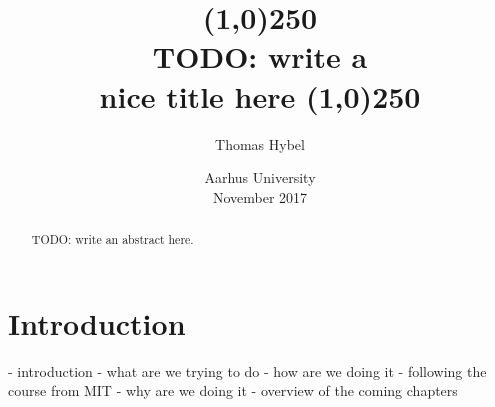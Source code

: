 \documentclass{article}
\title{
\line(1,0){250}\\
\Large \bfseries
TODO: write a \\
nice title here
\line(1,0){250}
}
\author{Thomas Hybel}
\date{Aarhus University \\ November 2017}
\begin{document}
\maketitle

\begin{abstract} 
\noindent 
TODO: write an abstract here.
\end{abstract}
\newpage

\tableofcontents
\newpage
{}




\section{Introduction}


- introduction
	- what are we trying to do
	- how are we doing it
		- following the course from MIT
	- why are we doing it
	- overview of the coming chapters











\end{document}
